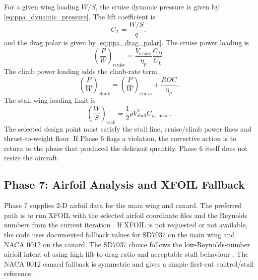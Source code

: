 For a given wing loading \(W/S\), the cruise dynamic pressure is given by \autoref{eq:ppa_dynamic_pressure}. The lift coefficient is
\begin{equation}
    C_L = \frac{W/S}{q},
    \label{eq:ppa_constraint_cl}
\end{equation}
and the drag polar is given by \autoref{eq:ppa_drag_polar}. The cruise power loading is
\begin{equation}
    \left(\frac{P}{W}\right)_{\mathrm{cruise}} =
    \frac{V_{\mathrm{cruise}}}{\eta_p}
    \frac{C_D}{C_L}.
    \label{eq:ppa_constraint_cruise}
\end{equation}
The climb power loading adds the climb-rate term,
\begin{equation}
    \left(\frac{P}{W}\right)_{\mathrm{climb}} =
    \left(\frac{P}{W}\right)_{\mathrm{cruise}}
    + \frac{ROC}{\eta_p}.
    \label{eq:ppa_constraint_climb}
\end{equation}
The stall wing-loading limit is
\begin{equation}
    \left(\frac{W}{S}\right)_{\mathrm{stall}} =
    \frac{1}{2}\rho V_{\mathrm{stall}}^2 C_{L,\max}.
    \label{eq:ppa_constraint_stall}
\end{equation}
The selected design point must satisfy the stall line, cruise/climb power lines and thrust-to-weight floor. If Phase 6 flags a violation, the corrective action is to return to the phase that produced the deficient quantity. Phase 6 itself does not resize the aircraft.

\subsection{Phase 7: Airfoil Analysis and XFOIL Fallback}
\label{subsec:ppa_phase7}

Phase 7 supplies 2-D airfoil data for the main wing and canard. The preferred path is to run XFOIL with the selected airfoil coordinate files and the Reynolds numbers from the current iteration \cite{Drela1989XFOIL,DrelaYoungrenXFOILweb}. If XFOIL is not requested or not available, the code uses documented fallback values for SD7037 on the main wing and NACA 0012 on the canard. The SD7037 choice follows the low-Reynolds-number airfoil intent of using high lift-to-drag ratio and acceptable stall behaviour \cite{SeligUIUCVol1}. The NACA 0012 canard fallback is symmetric and gives a simple first-cut control/stall reference \cite{AbbottVonDoenhoff1959}.

